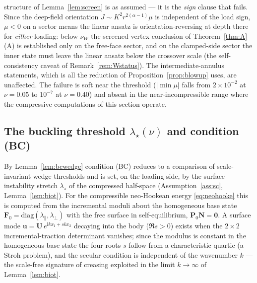 structure of Lemma~\ref{lem:screen} is as assumed --- it is the \emph{sign} clause that fails. Since the deep-field
orientation $J\sim K^2r^{2(\alpha-1)}\mu$ is independent of the load sign, $\mu<0$ on a sector means the linear
ansatz is orientation-reversing at depth there for \emph{either} loading: below $\nu_W$ the screened-vertex
conclusion of Theorem~\ref{thm:A}(A) is established only on the free-face sector, and on the clamped-side sector the
inner state must leave the linear ansatz below the crossover scale (the self-consistency caveat of
Remark~\ref{rem:Wstatus}). The intermediate-annulus statements, which is all the reduction of
Proposition~\ref{prop:blowup} uses, are unaffected. The failure is soft near the threshold ($|\min\mu|$ falls from
$2\times10^{-2}$ at $\nu=0.05$ to $10^{-7}$ at $\nu=0.40$) and absent in the near-incompressible range where the
compressive computations of this section operate.

\subsection{The buckling threshold \texorpdfstring{$\lambda_\star(\nu)$}{lambda*(nu)} and condition (BC)}
\label{sub:numbiot}

By Lemma~\ref{lem:bcwedge} condition (BC) reduces to a comparison of scale-invariant wedge thresholds and is set, on the
loading side, by the surface-instability stretch $\lambda_\star$ of the compressed half-space (Assumption~\ref{ass:sc},
Lemma~\ref{lem:biot}). For the compressible neo-Hookean energy \eqref{eq:neohooke} this is computed from the incremental
moduli about the homogeneous base state $\bm{F}_0=\mathrm{diag}(\lambda_\parallel,\lambda_\perp)$ with the free surface
in self-equilibrium, $\bm{P}_0\bm{N}=\bm0$. A surface mode $\bm{u}=\bm{U}\,e^{\mathrm{i}kx_1+sk x_2}$ decaying into the
body ($\Re s>0$) exists when the $2\times2$ incremental-traction determinant vanishes; since the modulus is constant in
the homogeneous base state the four roots $s$ follow from a characteristic quartic (a Stroh problem), and the secular
condition is independent of the wavenumber $k$ --- the scale-free signature of creasing exploited in the limit
$k\to\infty$ of Lemma~\ref{lem:biot}.

